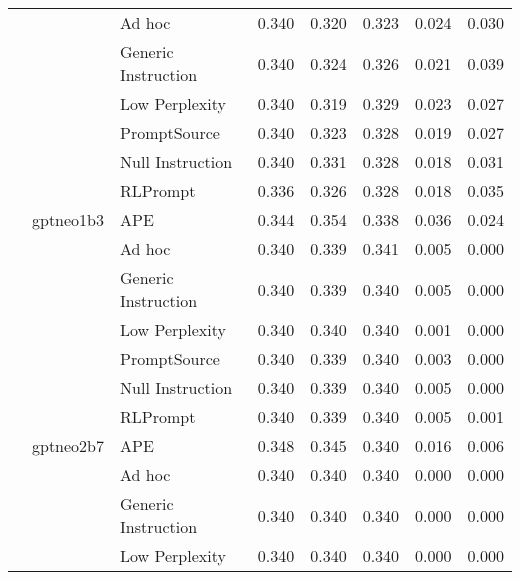 \begin{supertabular}{lllrrrrr}
              &        & Ad hoc &            0.340 &           0.320 &          0.323 &        0.024 &    0.030 \\
              &        & Generic Instruction &            0.340 &           0.324 &          0.326 &        0.021 &    0.039 \\
              &        & Low Perplexity &            0.340 &           0.319 &          0.329 &        0.023 &    0.027 \\
              &        & PromptSource &            0.340 &           0.323 &          0.328 &        0.019 &    0.027 \\
              &        & Null Instruction &            0.340 &           0.331 &          0.328 &        0.018 &    0.031 \\
              &        & RLPrompt &            0.336 &           0.326 &          0.328 &        0.018 &    0.035 \\
              & gptneo1b3 & APE &            0.344 &           0.354 &          0.338 &        0.036 &    0.024 \\
              &        & Ad hoc &            0.340 &           0.339 &          0.341 &        0.005 &    0.000 \\
              &        & Generic Instruction &            0.340 &           0.339 &          0.340 &        0.005 &    0.000 \\
              &        & Low Perplexity &            0.340 &           0.340 &          0.340 &        0.001 &    0.000 \\
              &        & PromptSource &            0.340 &           0.339 &          0.340 &        0.003 &    0.000 \\
              &        & Null Instruction &            0.340 &           0.339 &          0.340 &        0.005 &    0.000 \\
              &        & RLPrompt &            0.340 &           0.339 &          0.340 &        0.005 &    0.001 \\
              & gptneo2b7 & APE &            0.348 &           0.345 &          0.340 &        0.016 &    0.006 \\
              &        & Ad hoc &            0.340 &           0.340 &          0.340 &        0.000 &    0.000 \\
              &        & Generic Instruction &            0.340 &           0.340 &          0.340 &        0.000 &    0.000 \\
              &        & Low Perplexity &            0.340 &           0.340 &          0.340 &        0.000 &    0.000 \\

\end{supertabular}

